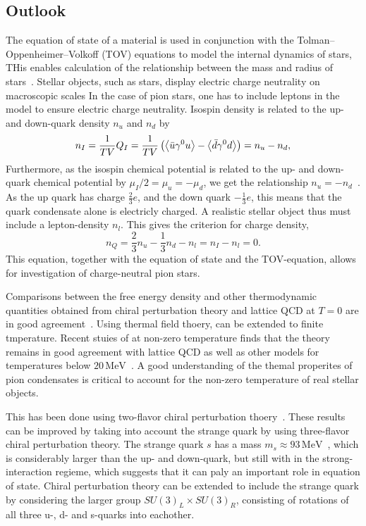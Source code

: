 \subsection*{Outlook}

The equation of state of a material is used in conjunction with the Tolman–Oppenheimer–Volkoff (TOV) equations to model the internal dynamics of stars,
THis enables calculation of the relationship between the mass and radius of stars~\cite{Carroll:spacetime}.
Stellar objects, such as stars, display electric charge neutrality on macroscopic scales
In the case of pion stars, one has to include leptons in the model to ensure electric charge neutrality.
Isospin density is related to the up- and down-quark density $n_u$ and $n_d$ by
\begin{equation}
    n_I 
    = \frac{1}{TV} Q_I 
    = \frac{1}{TV} \left(\ex{\bar u \gamma^0 u} - \ex{\bar d \gamma^0 d} \right) 
    = n_u - n_d,
\end{equation}
Furthermore, as the isospin chemical potential is related to the up- and down-quark chemical potential by $\mu_I/2 = \mu_u = -\mu_d$, we get the relationship $n_u = -n_d$~\cite{new_clas_of_compact_stars}.
As the up quark has charge $\frac{2}{3}e$, and the down quark $-\frac{1}{3}e$, this means that the quark condensate alone is electricly charged.
A realistic stellar object thus must include a lepton-density $n_l$.
This gives the criterion for charge density,
\begin{equation}
    n_Q = \frac{2}{3}n_u - \frac{1}{3} n_d - n_l = n_I - n_l = 0.
\end{equation}
This equation, together with the equation of state and the TOV-equation, allows for investigation of charge-neutral pion stars.

Comparisons between the free energy density and other thermodynamic quantities obtained from chiral perturbation theory and lattice QCD at $T = 0$ are in good agreement~\cite{Andersen:two-flavor-chpt,mojahed}.
Using thermal field thoery, \chpt can be extended to finite tmperature.
Recent stuies of \chpt at non-zero temperature finds that the theory remains in good agreement with lattice QCD as well as other models for temperatures below $20 \, \text{MeV}$~\cite{andersen_mojahed:condensates_and_pressure}.
A good understanding of the themal properites of pion condensates is critical to account for the non-zero temperature of real stellar objects.

This has been done using two-flavor chiral perturbation thoery~\cite{Andersen:two-flavor-chpt,andersen:bose_einstein}.
These results can be improved by taking into account the strange quark by using three-flavor chiral perturbation theory.
The strange quark $s$ has a mass $m_s \approx 93 \, \text{MeV}$~\cite{PDG}, which is considerably larger than the up- and down-quark, but still with in the strong-interaction regieme, which suggests that it can paly an important role in equation of state.
Chiral perturbation theory can be extended to include the strange quark by considering the larger group $SU(3)_L \times SU(3)_R$, consisting of rotations of all three u-, d- and s-quarks into eachother.

